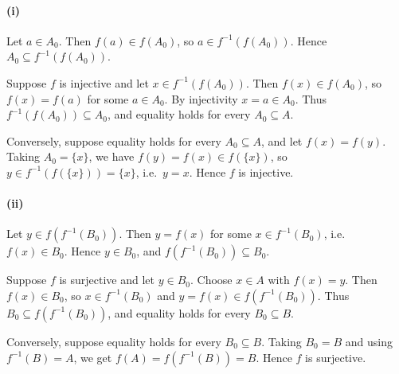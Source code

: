 
\paragraph{(i)} Let $a\in A_0$. Then $f(a)\in f(A_0)$, so $a\in f^{-1}(f(A_0))$. Hence
$A_0\subseteq f^{-1}(f(A_0))$.

Suppose $f$ is injective and let $x\in f^{-1}(f(A_0))$. Then $f(x)\in f(A_0)$, so
$f(x)=f(a)$ for some $a\in A_0$. By injectivity $x=a\in A_0$. Thus
$f^{-1}(f(A_0))\subseteq A_0$, and equality holds for every $A_0\subseteq A$.

Conversely, suppose equality holds for every $A_0\subseteq A$, and let $f(x)=f(y)$. Taking
$A_0=\{x\}$, we have $f(y)=f(x)\in f(\{x\})$, so
$y\in f^{-1}(f(\{x\}))=\{x\}$, i.e.\ $y=x$. Hence $f$ is injective.

\paragraph{(ii)} Let $y\in f(f^{-1}(B_0))$. Then $y=f(x)$ for some $x\in f^{-1}(B_0)$, i.e.\
$f(x)\in B_0$. Hence $y\in B_0$, and $f(f^{-1}(B_0))\subseteq B_0$.

Suppose $f$ is surjective and let $y\in B_0$. Choose $x\in A$ with $f(x)=y$. Then
$f(x)\in B_0$, so $x\in f^{-1}(B_0)$ and $y=f(x)\in f(f^{-1}(B_0))$. Thus
$B_0\subseteq f(f^{-1}(B_0))$, and equality holds for every $B_0\subseteq B$.

Conversely, suppose equality holds for every $B_0\subseteq B$. Taking $B_0=B$ and using
$f^{-1}(B)=A$, we get $f(A)=f(f^{-1}(B))=B$. Hence $f$ is surjective.
